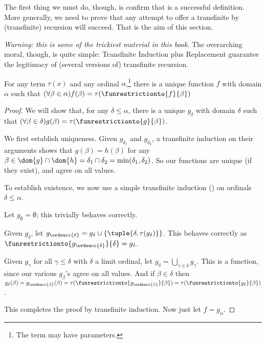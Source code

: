 \documentclass[../../../include/open-logic-section]{subfiles}
\begin{document}
The first thing we must do, though, is confirm that  is a successful definition. More generally, we need to prove that any attempt to offer a transfinite by (transfinite) recursion will succeed. That is the aim of this section. 

\emph{Warning: this is some of the trickiest material in this book}. The overarching moral, though, is quite simple: Transfinite Induction plus Replacement guarantee the legitimacy of (several versions of) transfinite recursion.
\begin{thm}
	For any term $\tau(x)$ and any ordinal $\alpha$,\footnote{The term may have parameters.} there is a unique function $f$ with domain $\alpha$ such that $(\forall \beta \in \alpha)f(\beta) = \tau(\funrestrictionto{f}{\beta})$
\end{thm}
\begin{proof}
	We will show that, for any $\delta \leq \alpha$, there is a unique $g_\delta$ with domain $\delta$ such that $(\forall \beta \in \delta)g(\beta) = \tau(\funrestrictionto{g}{\beta})$. 
	
	We first establish uniqueness. Given $g_{\delta_1}$ and $g_{\delta_2}$, a transfinite induction on their arguments shows that $g(\beta) = h(\beta)$ for any $\beta \in \dom{g} \cap \dom{h} = \delta_1 \cap \delta_2 = \min(\delta_1, \delta_2)$. So our functions are unique (if they exist), and agree on all values.

	To establish existence, we now use a simple transfinite induction () on ordinals $\delta \leq \alpha$. 
	
	Let $g_\emptyset = \emptyset$; this trivially behaves correctly.
	
	Given $g_\delta$, let $g_{\ordsucc{\delta}} =  g_\delta \cup \{\tuple{\delta, \tau(g_\delta)}\}$. This behaves correctly as $\funrestrictionto{g_{\ordsucc{\delta}}}{\delta} = g_\delta$. 
		
	Given $g_\gamma$ for all $\gamma \leq \delta$ with $\delta$ a limit ordinal, let $g_\delta = \bigcup_{\gamma \in \delta} g_\gamma$. This is a function, since our various $g_\beta$'s agree on all values. And if $\beta \in \delta$ then $g_\delta(\beta) = g_{\ordsucc{\beta}}(\beta) = \tau(\funrestrictionto{g_{\ordsucc{\beta}}}{\beta}) = \tau(\funrestrictionto{g_\delta}{\beta})$.
	
	This completes the proof by transfinite induction. Now just let $f = g_\alpha$.
\end{proof}\noindent
\end{document}
